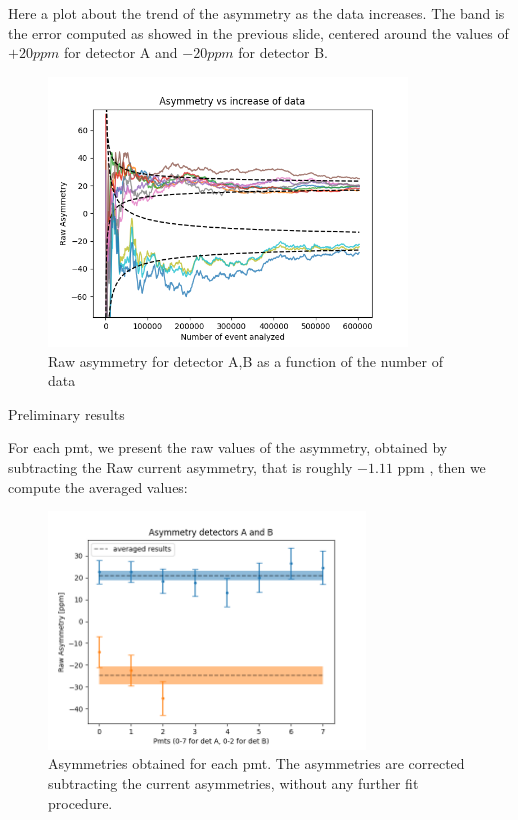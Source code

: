 \documentclass[8pt,a4paper]{beamer}
\begin{document}
\begin{frame}

Here a plot about the trend of the asymmetry as the data increases. The band is the error computed as showed in the previous slide, centered around the values of $+20ppm$ for detector A and $-20ppm$ for detector B.

\begin{figure}[hbtp]
\centering
\includegraphics[width = 0.85\textwidth]{figures/asymmetries_all.png}
\caption{Raw asymmetry for detector A,B as a function of the number of data}
\end{figure}

\end{frame}

\begin{frame}{Preliminary results}

For each pmt, we present the raw values of the asymmetry, obtained by subtracting the Raw current asymmetry, that is roughly $-1.11$ ppm , then we compute the averaged values:

\begin{figure}[hbtp]
\centering
\includegraphics[width = 0.75\textwidth]{figures/RawResults.png}
\caption{Asymmetries obtained for each pmt. The asymmetries are corrected subtracting the current asymmetries, without any further fit procedure.}
\end{figure}
\end{frame}
\end{document}
